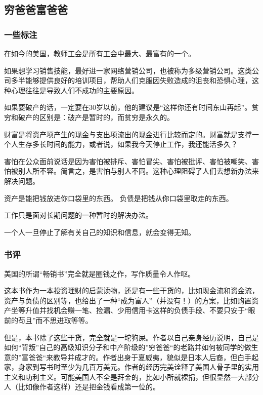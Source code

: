 \subsection{穷爸爸富爸爸}

\subsubsection{一些标注}
\begin{itemize*}
	\item 在如今的美国，教师工会是所有工会中最大、最富有的一个。
	\item 如果想学习销售技能，最好进一家网络营销公司，也被称为多级营销公司。这类公司多半能够提供良好的培训项目，帮助人们克服因失败造成的沮丧和恐惧心理，这种心理往往是导致人们不成功的主要原因。
	\item 如果要破产的话，一定要在30岁以前，他的建议是“这样你还有时间东山再起”。贫穷和破产的区别是：破产是暂时的，而贫穷是永久的。
	\item 财富是将资产项产生的现金与支出项流出的现金进行比较而定的。财富就是支撑一个人生存多长时间的能力，或者说，如果我今天停止工作，我还能活多久？
	\item 害怕在公众面前说话是因为害怕被排斥、害怕冒尖、害怕被批评、害怕被嘲笑、害怕被别人所不容。简言之，是害怕与别人不同。这种心理阻碍了人们去想新办法来解决问题。
	\item 资产是能把钱放进你口袋里的东西。 负债是把钱从你口袋里取走的东西。
	\item 工作只是面对长期问题的一种暂时的解决办法。
	\item 一个人一旦停止了解有关自己的知识和信息，就会变得无知。
\end{itemize*}

\subsubsection{书评}
美国的所谓“畅销书”完全就是圈钱之作，写作质量令人作呕。

这本书作为一本投资理财的启蒙读物，还是有一些干货的，比如现金流和资金流，资产与负债的区别等，也给出了一种“成为富人”（并没有！）的方案，比如购置资产坐等升值并找机会赚一笔、捡漏、少用信用卡这样的负债手段、不要只安于“眼前的苟且”而不思进取等等。

但是，本书除了这些干货，完全就是一坨狗屎。作者以自己亲身经历说明，自己是如何“背叛”自己的高级知识分子和中产阶级的”穷爸爸“的老路并如何被同学的做生意的”富爸爸“来教导并成才的。作者出身于夏威夷，貌似是日本人后裔，但白手起家，身家到写书时至少为几百万美元。作者的经历完美诠释了美国人骨子里的实用主义和功利主义。可能美国人不全是拜金的，比如小所就裸捐，但很显然一大部分人（比如像作者这样）还是把金钱看成第一位的。

